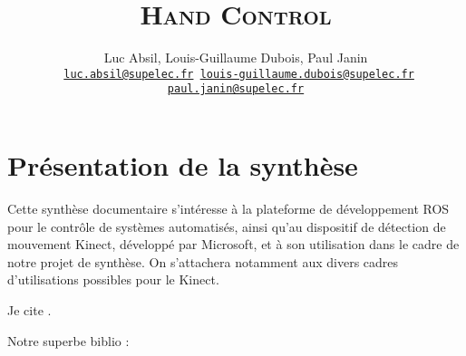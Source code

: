 \documentclass[fontsize=14pt, DIV=calc, a4paper]{scrartcl}
\title{\textsc{Hand Control}\\
\Huge \textbf{}}
\author{Luc Absil, Louis-Guillaume Dubois, Paul Janin\\
\bigskip
{\tt \small
\href{mailto:luc.absil@supelec.fr}{luc.absil@supelec.fr}
\href{mailto:louis-guillaume.dubois@supelec.fr}{louis-guillaume.dubois@supelec.fr}
\href{mailto:paul.janin@supelec.fr}{paul.janin@supelec.fr}}}
\date{}
\begin{document}
\maketitle
\section{Présentation de la synthèse}
Cette synthèse documentaire s'intéresse à la plateforme de développement ROS pour le contrôle de systèmes automatisés, ainsi qu'au dispositif de détection de mouvement Kinect, 
développé par Microsoft, et à son utilisation dans le cadre de notre projet de synthèse. On s'attachera notamment aux divers cadres d'utilisations possibles pour le Kinect.

Je cite \cite{blagues}.

Notre superbe biblio :
 
\end{document}
